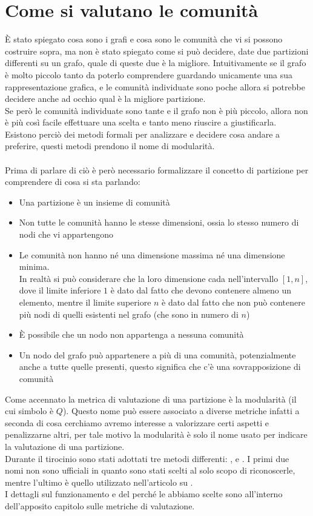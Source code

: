 \section{Come si valutano le comunità}
È stato spiegato cosa sono i grafi e cosa sono le comunità che vi si possono costruire sopra, ma non è stato spiegato come si può decidere, date due partizioni differenti su un grafo, quale di queste due è la migliore. Intuitivamente se il grafo è molto piccolo tanto da poterlo comprendere guardando unicamente una sua rappresentazione grafica, e le comunità individuate sono poche allora si potrebbe decidere anche ad occhio qual è la migliore partizione.\\
Se però le comunità individuate sono tante e il grafo non è più piccolo, allora non è più così facile effettuare una scelta e tanto meno riuscire a giustificarla. Esistono perciò dei metodi formali per analizzare e decidere cosa andare a preferire, questi metodi prendono il nome di modularità.\\
\\
Prima di parlare di ciò è però necessario formalizzare il concetto di partizione per comprendere di cosa si sta parlando:
\begin{itemize}
	\item Una partizione è un insieme di comunità
	\item Non tutte le comunità hanno le stesse dimensioni, ossia lo stesso numero di nodi che vi appartengono
	\item Le comunità non hanno né una dimensione massima né una dimensione minima.\\
	In realtà si può considerare che la loro dimensione cada nell'intervallo $[1, n]$, dove il limite inferiore $1$ è dato dal fatto che devono contenere almeno un elemento, mentre il limite superiore $n$ è dato dal fatto che non può contenere più nodi di quelli esistenti nel grafo (che sono in numero di $n$)
	\item È possibile che un nodo non appartenga a nessuna comunità
	\item Un nodo del grafo può appartenere a più di una comunità, potenzialmente anche a tutte quelle presenti, questo significa che c'è una sovrapposizione di comunità
\end{itemize}
Come accennato la metrica di valutazione di una partizione è la modularità (il cui simbolo è $Q$). Questo nome può essere associato a diverse metriche infatti a seconda di cosa cerchiamo avremo interesse a valorizzare certi aspetti e penalizzarne altri, per tale motivo la modularità è solo il nome usato per indicare la valutazione di una partizione.\\
Durante il tirocinio sono stati adottati tre metodi differenti: \mmax, \mover e \mmod. I primi due nomi non sono ufficiali in quanto sono stati scelti al solo scopo di riconoscerle, mentre l'ultimo \mmod è quello utilizzato nell'articolo su \cnrl .\\
I dettagli sul funzionamento e del perché le abbiamo scelte sono all'interno dell'apposito capitolo sulle metriche di valutazione.
%

